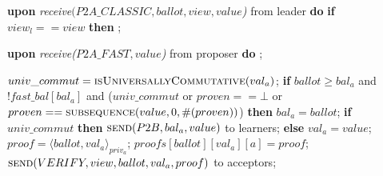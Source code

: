 \begin{algorithm}
\begin{algorithmic}[1]
		\State
		\State \textbf{upon} \textit{receive$(P2A\_CLASSIC, ballot, view, value$)} from leader \textbf{do}
		\State \hspace{\algorithmicindent} \textbf{if} $view_l == view$ \textbf{then}
		\State \hspace{\algorithmicindent}\hspace{\algorithmicindent} ; 
		
		\State		
		\State \textbf{upon} \textit{receive($P2A\_FAST, value$)} from proposer \textbf{do}
		\State \hspace{\algorithmicindent} ;
	
		\State
		\State $univ\_commut = \Call{isUniversallyCommutative}{val_a}$;
		\State \textbf{if} $ballot \geq bal_a$ and \ $!fast\_bal[bal_a]$ and ($univ\_commut$ or $proven == \bot$ or $proven == \Call{subsequence}{value, 0, \#(proven)}$) \textbf{then}
		\State \hspace{\algorithmicindent} $bal_a = ballot$;
		\State \hspace{\algorithmicindent} \textbf{if} $univ\_commut$ \textbf{then}
		\State \hspace{\algorithmicindent}\hspace{\algorithmicindent} $\Call{send}{P2B,bal_a, value}$ to learners;
		\State \hspace{\algorithmicindent} \textbf{else} 
		\State \hspace{\algorithmicindent}\hspace{\algorithmicindent} $val_a = value$;
		\State \hspace{\algorithmicindent}\hspace{\algorithmicindent} $proof = \langle ballot, val_a \rangle_{priv_a}$;
		\State \hspace{\algorithmicindent}\hspace{\algorithmicindent} $proofs[ballot][val_a][a] = proof$;
		\State \hspace{\algorithmicindent}\hspace{\algorithmicindent} $\Call{send}{VERIFY, view, ballot, val_a, proof}$ to acceptors;
		\EndFunction
		

\end{algorithmic}
\end{algorithm}
